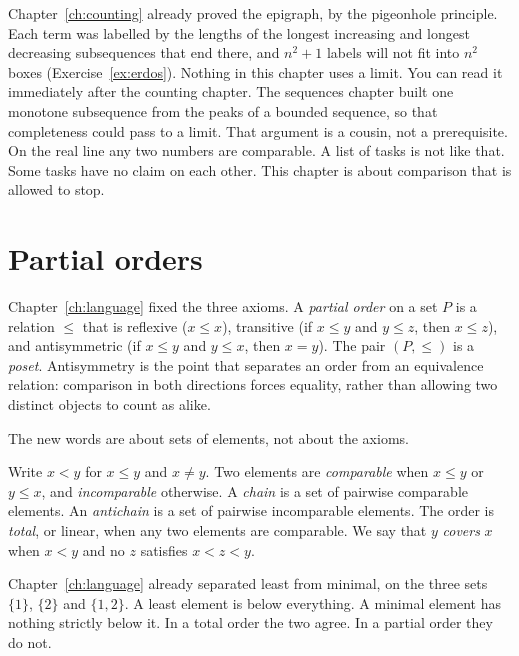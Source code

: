 Chapter~\ref{ch:counting} already proved the epigraph, by the pigeonhole principle. Each term was labelled by the lengths of the longest increasing and longest decreasing subsequences that end there, and $n^2+1$ labels will not fit into $n^2$ boxes (Exercise~\ref{ex:erdos}). Nothing in this chapter uses a limit. You can read it immediately after the counting chapter. The sequences chapter built one monotone subsequence from the peaks of a bounded sequence, so that completeness could pass to a limit. That argument is a cousin, not a prerequisite. On the real line any two numbers are comparable. A list of tasks is not like that. Some tasks have no claim on each other. This chapter is about comparison that is allowed to stop.

\section{Partial orders}

Chapter~\ref{ch:language} fixed the three axioms. A \emph{partial order} on a set $P$ is a relation $\le$ that is reflexive ($x\le x$), transitive (if $x\le y$ and $y\le z$, then $x\le z$), and antisymmetric (if $x\le y$ and $y\le x$, then $x=y$). The pair $(P,\le)$ is a \emph{poset}. Antisymmetry is the point that separates an order from an equivalence relation: comparison in both directions forces equality, rather than allowing two distinct objects to count as alike.

The new words are about sets of elements, not about the axioms.

\begin{definition}\label{orders:def:poset}
Write $x<y$ for $x\le y$ and $x\ne y$. Two elements are \emph{comparable} when $x\le y$ or $y\le x$, and \emph{incomparable} otherwise. A \emph{chain} is a set of pairwise comparable elements. An \emph{antichain} is a set of pairwise incomparable elements. The order is \emph{total}, or linear, when any two elements are comparable. We say that $y$ \emph{covers} $x$ when $x<y$ and no $z$ satisfies $x<z<y$.
\end{definition}

Chapter~\ref{ch:language} already separated least from minimal, on the three sets $\{1\}$, $\{2\}$ and $\{1,2\}$. A least element is below everything. A minimal element has nothing strictly below it. In a total order the two agree. In a partial order they do not.

